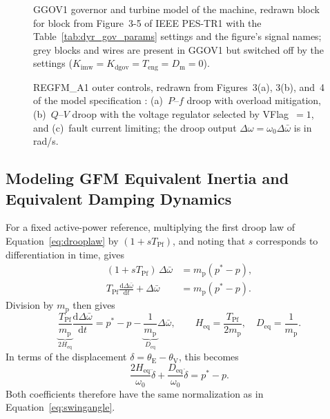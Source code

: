 \documentclass[11pt]{article}
\begin{document}
\begin{figure}[tbp]\centering

\caption{GGOV1 governor and turbine model of the machine, redrawn block for block from Figure~3-5 of IEEE PES-TR1 \cite{pestr1} with the Table~\ref{tab:dyr_gov_params} settings and the figure's signal names; grey blocks and wires are present in GGOV1 but switched off by the settings ($K_{\mathrm{imw}}=K_{\mathrm{dgov}}=T_{\mathrm{eng}}=D_{\mathrm{m}}=0$).}
\label{fig:controlblocks}
\end{figure}

\begin{figure}[tbp]\centering

\caption{REGFM\_A1 outer controls, redrawn from Figures~3(a), 3(b), and~4 of the model specification \cite{du2023a1}: (a)~$P$--$f$ droop with overload mitigation, (b)~$Q$--$V$ droop with the voltage regulator selected by VFlag~$=1$, and (c)~fault current limiting; the droop output $\Delta\omega=\omega_0\Delta\bar{\omega}$ is in rad/s.}
\label{fig:gfmblocks}
\end{figure}

\subsection{Modeling GFM Equivalent Inertia and Equivalent Damping Dynamics}
\label{sec:swingred}
For a fixed active-power reference, multiplying the first droop law of Equation~\eqref{eq:drooplaw} by $(1+sT_{\mathrm{Pf}})$, and noting that $s$ corresponds to differentiation in time, gives
\begin{align*}
(1+sT_{\mathrm{Pf}})\,\Delta\bar{\omega}&=m_{\mathrm{p}}(p^{*}-p),\\
T_{\mathrm{Pf}}\frac{\mathrm{d}\Delta\bar{\omega}}{\mathrm{d}t}+\Delta\bar{\omega}&=m_{\mathrm{p}}(p^{*}-p).
\end{align*}
Division by $m_{\mathrm{p}}$ then gives
\begin{equation}
\underbrace{\frac{T_{\mathrm{Pf}}}{m_{\mathrm{p}}}}_{2H_{\mathrm{eq}}}\frac{\mathrm{d}\Delta\bar{\omega}}{\mathrm{d}t}
=p^{*}-p-\underbrace{\frac{1}{m_{\mathrm{p}}}}_{D_{\mathrm{eq}}}\Delta\bar{\omega},
\qquad
\boxed{H_{\mathrm{eq}}=\frac{T_{\mathrm{Pf}}}{2m_{\mathrm{p}}},\quad D_{\mathrm{eq}}=\frac{1}{m_{\mathrm{p}}}.}
\label{eq:heqdeq}
\end{equation}
In terms of the displacement $\delta=\theta_{\mathrm{E}}-\theta_{\mathrm{V}}$, this becomes
\begin{equation}
\frac{2H_{\mathrm{eq}}}{\omega_0}\ddot\delta+
\frac{D_{\mathrm{eq}}}{\omega_0}\dot\delta=p^{*}-p.
\label{eq:gfmswing}
\end{equation}
Both coefficients therefore have the same normalization as in Equation~\eqref{eq:swingangle}.
\end{document}
